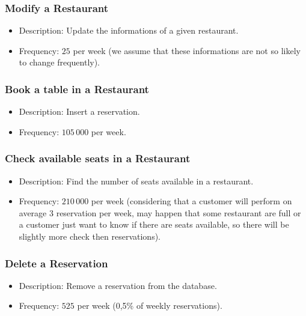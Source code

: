 \subsubsection{Modify a Restaurant}

\begin{itemize}
	\item Description: Update the informations of a given restaurant.
	\item Frequency: \(25\) per week (we assume that these informations are
		not so likely to change frequently).
\end{itemize}

\subsubsection{Book a table in a Restaurant}

\begin{itemize}
	\item Description: Insert a reservation.
	\item Frequency: \(105\,000\) per week.
\end{itemize}


\subsubsection{Check available seats in a Restaurant}

\begin{itemize}
	\item Description: Find the number of seats available in a restaurant.
	\item Frequency: \(210\,000\) per week (considering that a customer will perform on average 3 reservation per week, may happen that some restaurant are full or a customer just want to know if there are seats available, so there will be slightly more check then reservations).
\end{itemize}

\subsubsection{Delete a Reservation}

\begin{itemize}
	\item Description: Remove a reservation from the database.
	\item Frequency: \(525\) per week (0,5\% of weekly reservations).
\end{itemize}

